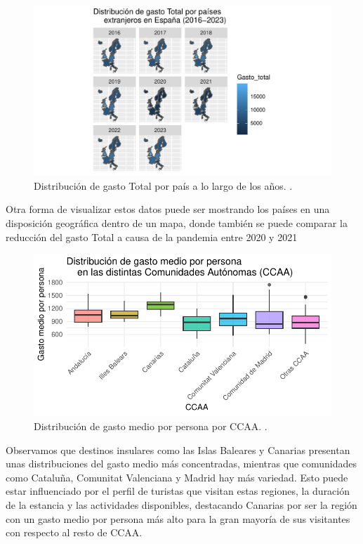 \documentclass[data,article,submit,moreauthors,pdftex]{Definitions/mdpi}
\begin{document}
\begin{figure}[H]
\includegraphics{ProyectoAED2024_Rmd_files/figure-latex/unnamed-chunk-27-1} \caption{Distribución de gasto Total por país a lo largo de los años. .\label{fig:geografGastoTotal}}\label{fig:unnamed-chunk-27}
\end{figure}

Otra forma de visualizar estos datos puede ser mostrando los países en
una disposición geográfica dentro de un mapa, donde también se puede
comparar la reducción del gasto Total a causa de la pandemia entre 2020
y 2021

\begin{figure}[H]
\includegraphics{ProyectoAED2024_Rmd_files/figure-latex/unnamed-chunk-28-1} \caption{Distribución de gasto medio por persona por CCAA. .\label{fig:cajas}}\label{fig:unnamed-chunk-28}
\end{figure}

Observamos que destinos insulares como las Islas Baleares y Canarias
presentan unas distribuciones del gasto medio más concentradas, mientras
que comunidades como Cataluña, Comunitat Valenciana y Madrid hay más
variedad. Esto puede estar influenciado por el perfil de turistas que
visitan estas regiones, la duración de la estancia y las actividades
disponibles, destacando Canarias por ser la región con un gasto medio
por persona más alto para la gran mayoría de sus visitantes con respecto
al resto de CCAA.
\end{document}
